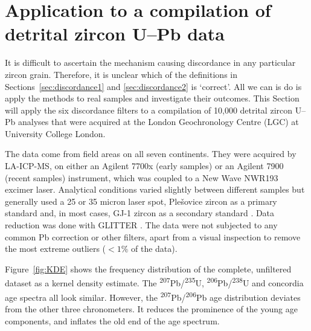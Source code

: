 \documentclass[gchron, manuscript]{copernicus}
\begin{document}
\section{Application to a compilation of detrital zircon U--Pb data}
\label{sec:application}

It is difficult to ascertain the mechanism causing discordance in any
particular zircon grain. Therefore, it is unclear which of the
definitions in Sections~\ref{sec:discordance1} and
\ref{sec:discordance2} is `correct'. All we can is do is apply the
methods to real samples and investigate their outcomes. This Section
will apply the six discordance filters to a compilation of 10,000
detrital zircon U--Pb analyses that were acquired at the London
Geochronology Centre (LGC) at University College London.

The data come from field areas on all seven continents. They were
acquired by LA-ICP-MS, on either an Agilent 7700x (early samples) or
an Agilent 7900 (recent samples) instrument, which was coupled to a
New Wave NWR193 excimer laser. Analytical conditions varied slightly
between different samples but generally used a 25 or 35 micron laser
spot, Ple\v{s}ovice zircon as a primary standard \citep{slama2008}
and, in most cases, GJ-1 zircon as a secondary standard
\citep{jackson2004}. Data reduction was done with GLITTER
\citep{griffin2008}. The data were not subjected to any common Pb
correction or other filters, apart from a visual inspection to remove
the most extreme outliers ($<1\%$ of the data).

Figure~\ref{fig:KDE} shows the frequency distribution of the complete,
unfiltered dataset as a kernel density estimate. The
\textsuperscript{207}Pb/\textsuperscript{235}U,
\textsuperscript{206}Pb/\textsuperscript{238}U and concordia age
spectra all look similar. However, the
\textsuperscript{207}Pb/\textsuperscript{206}Pb age distribution
deviates from the other three chronometers. It reduces the prominence
of the young age components, and inflates the old end of the age
spectrum.
\end{document}
